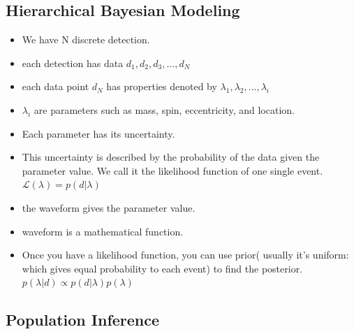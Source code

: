 \documentclass[twocolumn,prd,nofootinbib]{revtex4}
\begin{document}
\subsection{Hierarchical Bayesian Modeling}
\begin{itemize}
    \item We have N discrete detection.
    \item each detection has data $d_1,d_2,d_3,...,d_N$
    \item each data point $d_N$ has properties denoted by $\lambda_1,\lambda_2,...,\lambda_i$
    \item  $ \lambda_i$ are parameters such as mass, spin, eccentricity, and location.
    \item Each parameter has its uncertainty.
    \item This uncertainty is described by the probability of the data given the parameter value. We call it the likelihood function of one single event. $\mathcal{L}(\lambda) = p(d|\lambda)$
    \item the waveform gives the parameter value.
    \item waveform is a mathematical function.
    \item Once you have a likelihood function, you can use prior( usually it's uniform: which gives equal probability to each event) to find the posterior. $p(\lambda|d) \propto p(d|\lambda) p(\lambda)$  
    
\end{itemize}


\subsection{Population Inference}
\end{document}
